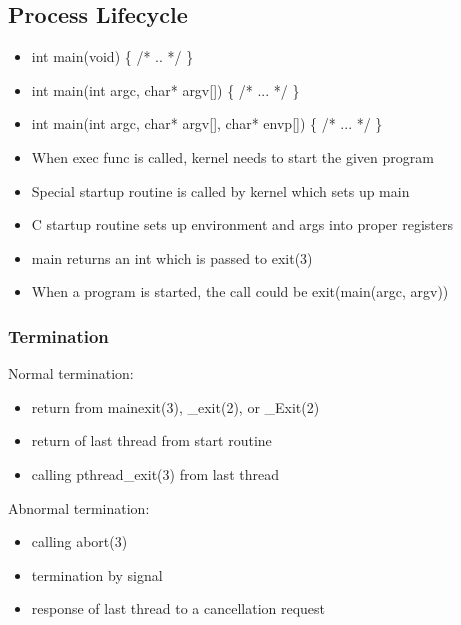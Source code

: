 \documentclass[10pt]{article}
\begin{document}
\scriptsize
\begin{multicols}{2}
    \begin{minipage}{\columnwidth}
        \subsection*{Process Lifecycle}
        \begin{itemize}
            \setlength{\itemsep}{-0em}
            \item int main(void) \{ /* .. */ \}
            \item int main(int argc, char* argv[]) \{ /* ... */ \}
            \item int main(int argc, char* argv[], char* envp[]) \{ /* ... */ \}
        \end{itemize}
        \begin{itemize}
            \setlength{\itemsep}{-0em}
            \item When exec func is called, kernel needs to start the given program
            \item Special startup routine is called by kernel which sets up main
            \item C startup routine sets up environment and args into proper registers
            \item main returns an int which is passed to exit(3)
            \item When a program is started, the call could be exit(main(argc, argv))
        \end{itemize}
        \subsubsection*{Termination}
        Normal termination:
        \begin{itemize}
            \setlength{\itemsep}{0em}
            \item return from mainexit(3), \_exit(2), or \_Exit(2)
            \item return of last thread from start routine
            \item calling pthread\_exit(3) from last thread
        \end{itemize}
        Abnormal termination:
        \begin{itemize}
            \setlength{\itemsep}{0em}
            \item calling abort(3)
            \item termination by signal
            \item response of last thread to a cancellation request
        \end{itemize}

\end{minipage}
\end{multicols}
\end{document}
